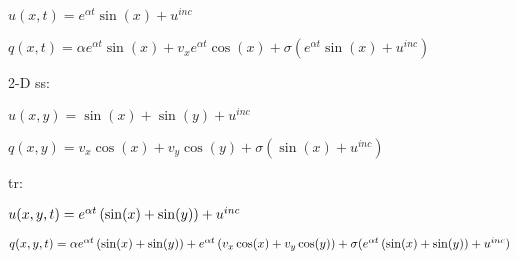 $u(x,t) = e^{\alpha t}\sin(x) + u^{inc}$

$q(x,t) = \alpha e^{\alpha t}\sin(x) + v_x e^{\alpha t}\cos(x)
   + \sigma(e^{\alpha t}\sin(x) + u^{inc})$

2-D ss:

$u(x,y) = \sin(x) + \sin(y) + u^{inc}$

$q(x,y) = v_x\cos(x) + v_y\cos(y) + \sigma(\sin(x) + u^{inc})$

tr:

$u(x,y,t) = e^{\alpha t}\left(\sin(x) + \sin(y)\right) + u^{inc}$

$q(x,y,t) = \alpha e^{\alpha t}\left(\sin(x) + \sin(y)\right)
   + e^{\alpha t}\left(v_x \cos(x) + v_y \cos(y)\right)
   + \sigma(e^{\alpha t}\left(\sin(x) + \sin(y)\right) + u^{inc})$

%
